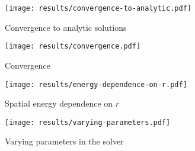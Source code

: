 \begin{figure}[H]
  \centering
  \label{fig:convergence-to-analytic}
  \texttt{[image: results/convergence-to-analytic.pdf]}
  \caption{Convergence to analytic solutions}
\end{figure}

\begin{figure}[H]
  \centering
  \label{fig:convergence}
  \texttt{[image: results/convergence.pdf]}
  \caption{Convergence}
\end{figure}

\begin{figure}[H]
  \centering
  \label{fig:spatial-energy-dependence}
  \texttt{[image: results/energy-dependence-on-r.pdf]}
  \caption{Spatial energy dependence on $r$}
\end{figure}

\begin{figure}[H]
  \centering
  \label{fig:varying-parameters}
  \texttt{[image: results/varying-parameters.pdf]}
  \caption{Varying parameters in the solver}
\end{figure}
